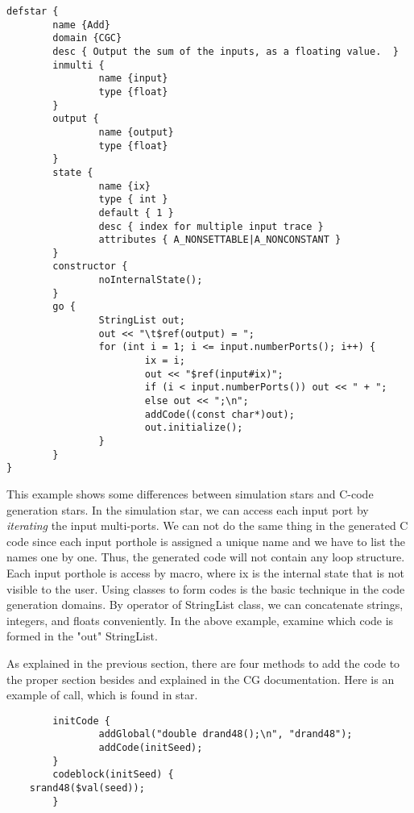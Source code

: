 \begin{verbatim}
defstar {
        name {Add}
        domain {CGC}
        desc { Output the sum of the inputs, as a floating value.  }
        inmulti {
                name {input}
                type {float}
        }
        output {
                name {output}
                type {float}
        }
        state {
                name {ix}
                type { int }
                default { 1 }
                desc { index for multiple input trace }
                attributes { A_NONSETTABLE|A_NONCONSTANT }
        }
        constructor {
                noInternalState();
        }
        go {
                StringList out;
                out << "\t$ref(output) = ";
                for (int i = 1; i <= input.numberPorts(); i++) {
                        ix = i;
                        out << "$ref(input#ix)";
                        if (i < input.numberPorts()) out << " + ";
                        else out << ";\n";
                        addCode((const char*)out);
                        out.initialize();
                }
        }
}
\end{verbatim}

 This example shows some differences between simulation stars and 
C-code generation stars.
 In the simulation star, we can access each input port by \emph{iterating}
the input multi-ports.
 We can not do the same thing in the generated C code since each input
porthole is assigned a unique name and we have to list the names one by one.
 Thus, the generated code will not contain any loop structure.
 Each input porthole is access by
macro, where ix
is the internal state that is not visible to the user.
 Using
classes to form codes is the basic technique
in the code generation domains.
 By
operator of StringList class, we can concatenate strings,
integers, and floats conveniently.
 In the above example, examine which code is formed in the "out" StringList.

 As explained in the previous section, there are four methods to add
the code to the proper section besides
and 
explained in the CG documentation.
 Here is an example of
 
call, which is found in
 star.

\begin{verbatim}
        initCode {
                addGlobal("double drand48();\n", "drand48");
                addCode(initSeed);
        }
        codeblock(initSeed) {
    srand48($val(seed));
        }
\end{verbatim}

